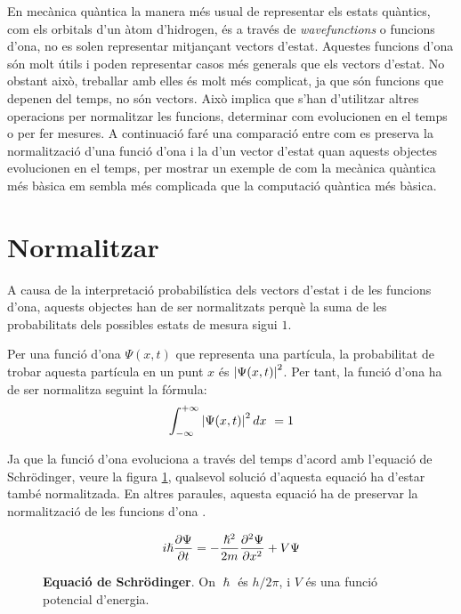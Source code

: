En mecànica quàntica la manera més usual de representar els estats quàntics, com els orbitals d'un àtom d'hidrogen, és a través de \textit{wavefunctions} o funcions d'ona, no es solen representar mitjançant vectors d'estat. Aquestes funcions d'ona són molt útils i poden representar casos més generals que els vectors d'estat. No obstant això, treballar amb elles és molt més complicat, ja que són funcions que depenen del temps, no són vectors. Això implica que s'han d'utilitzar altres operacions per normalitzar les funcions, determinar com evolucionen en el temps o per fer mesures. A continuació faré una comparació entre com es preserva la normalització d'una funció d'ona i la d'un vector d'estat quan aquests objectes evolucionen en el temps, per mostrar un exemple de com la mecànica quàntica més bàsica em sembla més complicada que la computació quàntica més bàsica.

\section{Normalitzar}
A causa de la interpretació probabilística dels vectors d'estat i de les funcions d'ona, aquests objectes han de ser normalitzats perquè la suma de les probabilitats dels possibles estats de mesura sigui $1$.

Per una funció d'ona $\Psi(x,t)$ que representa una partícula, la probabilitat de trobar aquesta partícula en un punt $x$ és $\abs{\Psi(x,t)}^2$. Per tant, la funció d'ona ha de ser normalitza seguint la fórmula:
\begin{equation}
\int_{-\infty}^{+\infty}\abs{\Psi(x,t)}^2\, dx\ = 1
\label{eq:norm_wave}
\end{equation}

Ja que la funció d'ona evoluciona a través del temps d'acord amb l'equació de Schrödinger, veure la figura \ref{fig:schro}, qualsevol solució d'aquesta equació ha d'estar també normalitzada. En altres paraules, aquesta equació ha de preservar la normalització de les funcions d'ona \cite{IntroQM:normalizing}.
\begin{figure}[H]
	$$
	i\hslash \pdv{\Psi}{t} = -\frac{\hslash^2}{2m}\pdv[2]{\Psi}{x}+V\Psi
	$$
	\caption{\textbf{Equació de Schrödinger}. On $\hslash$ és $h/2\pi$, i $V$ és una funció potencial d'energia.}
	\label{fig:schro}
\end{figure}


